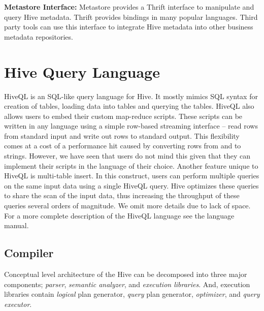 \documentclass[twocolumn]{article}
\begin{document}
\noindent
\textbf{Metastore Interface:} Metastore provides a Thrift interface to manipulate and query Hive metadata. Thrift provides bindings in many popular languages. Third party tools can use this interface to integrate Hive metadata into other business metadata repositories.

\section{Hive Query Language}
HiveQL is an SQL-like query language for Hive. It mostly mimics SQL syntax for creation of tables, loading data into tables and querying the tables. HiveQL also allows users to embed their custom map-reduce scripts. These scripts can be written in any language using a simple row-based streaming interface – read rows from standard input and write out rows to standard output. This flexibility comes at a cost of a performance hit caused by converting rows from and to strings. However, we have seen that users do not mind this given that they can implement their scripts in the language of their choice. Another feature unique to HiveQL is multi-table insert. In this construct, users can perform multiple queries on the same input data using a single HiveQL query. Hive optimizes these queries to share the scan of the input data, thus increasing the throughput of these queries several orders of magnitude. We omit more details due to lack of space. For a more complete description of the HiveQL language see the language manual.

\subsection{Compiler}
Conceptual level architecture of the Hive can be decomposed into three major components; \textit{parser}, \textit{semantic analyzer}, and \textit{execution libraries}. And, execution libraries contain \textit{logical} plan generator, \textit{query} plan generator, \textit{optimizer}, and \textit{query executor}.
\end{document}
